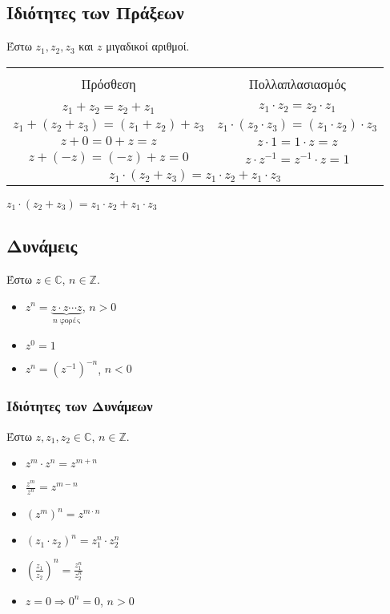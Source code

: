 \subsection*{Ιδιότητες των Πράξεων}

Έστω $z_{1}, z_{2}, z_{3}$ και $z$ μιγαδικοί
    αριθμοί.

\begin{table}[h!]
  \centering
  \begin{tabular}{cc}
    \toprule \\
    Πρόσθεση & Πολλαπλασιασμός \\
    \midrule \\
    $z_{1}+z_{2}=z_{2}+z_{1}$ & $z_{1}\cdot z_{2}=z_{2}\cdot z_{1}$ \\
    $z_{1}+(z_{2}+z_{3})=(z_{1}+z_{2})+z_{3}$ & $z_{1}\cdot (z_{2}\cdot z_{3})=(z_{1}\cdot z_{2})\cdot z_{3}$ \\
    $z+0=0+z=z$ &  $z\cdot 1=1\cdot z=z$ \\
    $z+(-z)=(-z)+z=0$ & $z\cdot z^{-1}=z^{-1}\cdot z=1$ \\
    \multicolumn{2}{c}{
    $z_{1}\cdot (z_{2}+z_{3})=z_{1}\cdot z_{2}+z_{1}\cdot z_{3}$} \\
    \bottomrule
  \end{tabular}
\end{table}






$z_{1}\cdot (z_{2}+z_{3})=z_{1}\cdot z_{2}+z_{1}\cdot z_{3}$




  \subsection*{Δυνάμεις}

   Έστω $z\in \mathbb{C}$, $n\in\mathbb{Z}$.
    \begin{itemize}
      \item $z^{n}=\underbrace{z\cdot z \cdots z}_{n\; \text{φορές}}$, $n>0$
      \item $z^{0}=1$
      \item $z^{n}=(z^{-1})^{-n}$, $n<0$
    \end{itemize}

\subsubsection*{Ιδιότητες των Δυνάμεων}

     Έστω $z, z_{1}, z_{2}\in \mathbb{C}$, $n\in\mathbb{Z}$.
    \begin{itemize}
      \item $z^{m}\cdot  z^{n}=z^{m+n}$
      \item $\frac{z^{m}}{z^{n}}=z^{m-n}$
      \item $(z^{m})^{n}=z^{m\cdot n}$
      \item $(z_{1}\cdot z_{2})^{n}=z_{1}^{n}\cdot z_{2}^{n}$
      \item $(\frac{z_{1}}{z_{2}})^{n}=\frac{z_{1}^{n}}{z_{2}^{n}}$
      \item $z=0\Rightarrow 0^{n}=0$, $n>0$
    \end{itemize}

